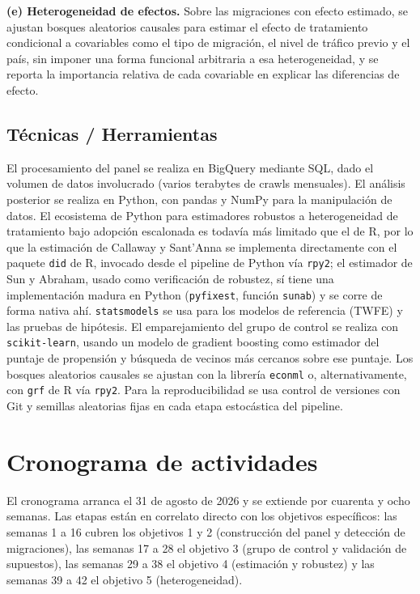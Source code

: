 \documentclass[12pt, a4paper]{article}
\begin{document}
\textbf{(e) Heterogeneidad de efectos.} Sobre las migraciones con efecto estimado, se ajustan bosques aleatorios causales \cite{wagerathey2018} para estimar el efecto de tratamiento condicional a covariables como el tipo de migración, el nivel de tráfico previo y el país, sin imponer una forma funcional arbitraria a esa heterogeneidad, y se reporta la importancia relativa de cada covariable en explicar las diferencias de efecto.

\subsection{Técnicas / Herramientas}

El procesamiento del panel se realiza en BigQuery mediante SQL, dado el volumen de datos involucrado (varios terabytes de crawls mensuales). El análisis posterior se realiza en Python, con pandas y NumPy para la manipulación de datos. El ecosistema de Python para estimadores robustos a heterogeneidad de tratamiento bajo adopción escalonada es todavía más limitado que el de R, por lo que la estimación de Callaway y Sant'Anna se implementa directamente con el paquete \texttt{did} de R, invocado desde el pipeline de Python vía \texttt{rpy2}; el estimador de Sun y Abraham, usado como verificación de robustez, sí tiene una implementación madura en Python (\texttt{pyfixest}, función \texttt{sunab}) y se corre de forma nativa ahí. \texttt{statsmodels} se usa para los modelos de referencia (TWFE) y las pruebas de hipótesis. El emparejamiento del grupo de control se realiza con \texttt{scikit-learn}, usando un modelo de gradient boosting como estimador del puntaje de propensión y búsqueda de vecinos más cercanos sobre ese puntaje. Los bosques aleatorios causales se ajustan con la librería \texttt{econml} o, alternativamente, con \texttt{grf} de R vía \texttt{rpy2}. Para la reproducibilidad se usa control de versiones con Git y semillas aleatorias fijas en cada etapa estocástica del pipeline.

\section{Cronograma de actividades}

El cronograma arranca el 31 de agosto de 2026 y se extiende por cuarenta y ocho semanas. Las etapas están en correlato directo con los objetivos específicos: las semanas 1 a 16 cubren los objetivos 1 y 2 (construcción del panel y detección de migraciones), las semanas 17 a 28 el objetivo 3 (grupo de control y validación de supuestos), las semanas 29 a 38 el objetivo 4 (estimación y robustez) y las semanas 39 a 42 el objetivo 5 (heterogeneidad).
\end{document}
